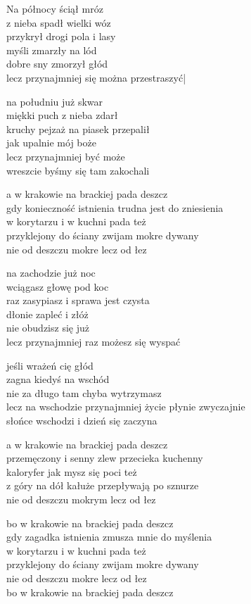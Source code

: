 \begin{text}
    Na północy ściął mróz\\
    z nieba spadł wielki wóz\\
    przykrył drogi pola i lasy\\
    myśli zmarzły na lód\\
    dobre sny zmorzył głód\\
    lecz przynajmniej się można przestraszyć|

    na południu już skwar\\
    miękki puch z nieba zdarł\\
    kruchy pejzaż na piasek przepalił\\
    jak upalnie mój boże\\
    lecz przynajmniej być może\\
    wreszcie byśmy się tam zakochali

    a w krakowie na brackiej pada deszcz\\
    gdy konieczność istnienia trudna jest do zniesienia\\
    w korytarzu i w kuchni pada też\\
    przyklejony do ściany zwijam mokre dywany\\
    nie od deszczu mokre lecz od łez

    na zachodzie już noc\\
    wciągasz głowę pod koc\\
    raz zasypiasz i sprawa jest czysta\\
    dłonie zapleć i złóż\\
    nie obudzisz się już\\
    lecz przynajmniej raz możesz się wyspać

    jeśli wrażeń cię głód\\
    zagna kiedyś na wschód\\
    nie za długo tam chyba wytrzymasz\\
    lecz na wschodzie przynajmniej życie płynie zwyczajnie\\
    słońce wschodzi i dzień się zaczyna

    a w krakowie na brackiej pada deszcz\\
    przemęczony i senny zlew przecieka kuchenny\\
    kaloryfer jak mysz się poci też\\
    z góry na dół kałuże przepływają po sznurze\\
    nie od deszczu mokrym lecz od łez

    bo w krakowie na brackiej pada deszcz\\
    gdy zagadka istnienia zmusza mnie do myślenia\\
    w korytarzu i w kuchni pada też\\
    przyklejony do ściany zwijam mokre dywany\\
    nie od deszczu mokre lecz od łez\\
    bo w krakowie na brackiej pada deszcz
\end{text}
